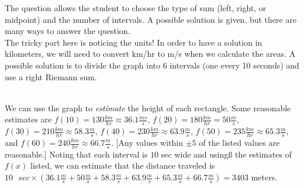 \begin{Answer}[ref=rsum4]
The question allows the student to choose the type of sum (left, right, or midpoint) and the number of intervals. A possible solution is given, but there are many ways to answer the question.\\
The tricky part here is noticing the units! In order to have a solution in kilometers, we will need to convert km/hr to m/s when we calculate the areas. A possible solution is to divide the graph into 6 intervals (one every 10 seconds) and use a right Riemann sum.

\\
We can use the graph to \textit{estimate} the height of each rectangle. Some reasonable estimates are $f(10) = 130\frac{km}{hr}\approx36.1\frac{ms}{s}$, $f(20) = 180\frac{km}{hr}=50\frac{m}{s}$, $f(30) = 210\frac{km}{hr}\approx58.3\frac{m}{s}$, $f(40) = 230\frac{km}{hr}\approx63.9\frac{m}{s}$, $f(50) = 235\frac{km}{hr}\approx65.3\frac{m}{s}$, and $f(60) = 240\frac{km}{hr}\approx66.7\frac{m}{s}$. [Any values within $\pm5$ of the listed values are reasonable.] Noting that each interval is $10$ sec wide and usingß the estimates of $f(x)$ listed, we can estimate that the distance traveled is $10\text{ }sec\times(36.1\frac{m}{s}+50\frac{m}{s}+58.3\frac{m}{s}+63.9\frac{m}{s}+65.3\frac{m}{s}+66.7\frac{m}{s})=3403$ meters.
\end{Answer}